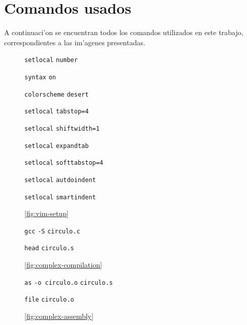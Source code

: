 \documentclass[11pt]{article}
\newcommand{\codetext}[2]{\large\texttt{\textcolor{#1}{#2}}}
\newcommand{\imagecaption}[1]{\vspace{-7pt}\caption*{\char91\ref{fig:#1}\char93}}
\begin{document}
	\section{Comandos usados}
		A continuaci'on se encuentran todos los comandos utilizados en este trabajo, correspondientes a las im'agenes presentadas.
		
		\begin{figure}[H]
			\centering
			\begin{code-box}
				\codetext{light-blue}{setlocal} \codetext{light-red}{number}
				
				\codetext{light-blue}{syntax} \codetext{light-red}{on}

				\codetext{light-blue}{colorscheme} \codetext{light-red}{desert}
				
				\codetext{light-blue}{setlocal} \codetext{light-red}{tabstop=4}

				\codetext{light-blue}{setlocal} \codetext{light-red}{shiftwidth=1}
				
				\codetext{light-blue}{setlocal} \codetext{light-red}{expandtab}
				
				\codetext{light-blue}{setlocal} \codetext{light-red}{softtabstop=4}
				
				\codetext{light-blue}{setlocal} \codetext{light-red}{autdoindent}
				
				\codetext{light-blue}{setlocal} \codetext{light-red}{smartindent}
			\end{code-box}
			\imagecaption{vim-setup}
		\end{figure}
		
		\begin{figure}[H]
			\centering
			\begin{code-box}
				\codetext{light-blue}{gcc} \codetext{orange-desert-vim}{-S} \codetext{light-red}{circulo.c}
				
				\codetext{light-blue}{head} \codetext{light-red}{circulo.s}
			\end{code-box}
			\imagecaption{complex-compilation}
		\end{figure}
		
		\begin{figure}[H]
			\centering
			\begin{code-box}
				\codetext{light-blue}{as} \codetext{orange-desert-vim}{-o circulo.o} \codetext{light-red}{circulo.s}
				
				\codetext{light-blue}{file} \codetext{light-red}{circulo.o}
			\end{code-box}
			\imagecaption{complex-assembly}
		\end{figure}
		
\end{document}
